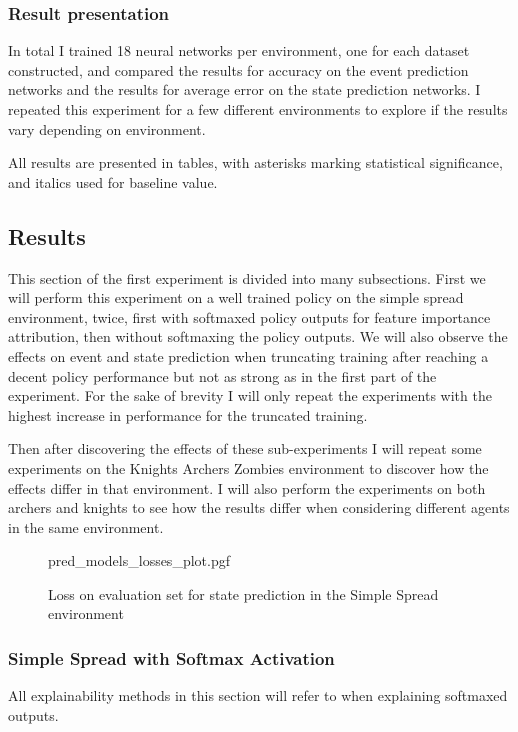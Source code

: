 \documentclass[UKenglish]{uiomasterthesis}
\begin{document}
\subsubsection{Result presentation}
In total I trained 18 neural networks per environment, one for each dataset constructed, and compared the results for accuracy on the event prediction networks and the results for average error on the state prediction networks. I repeated this experiment for a few different environments to explore if the results vary depending on environment.

All results are presented in tables, with asterisks marking statistical significance, and italics used for baseline value.

\subsection{Results}
This section of the first experiment is divided into many subsections. First we will perform this experiment on a well trained policy on the simple spread environment, twice, first with softmaxed policy outputs for feature importance attribution, then without softmaxing the policy outputs. We will also observe the effects on event and state prediction when truncating training after reaching a decent policy performance but not as strong as in the first part of the experiment. For the sake of brevity I will only repeat the experiments with the highest increase in performance for the truncated training.

Then after discovering the effects of these sub-experiments I will repeat some experiments on the Knights Archers Zombies environment to discover how the effects differ in that environment. I will also perform the experiments on both archers and knights to see how the results differ when considering different agents in the same environment.

\begin{figure}[H]
    \centering
    {pred_models_losses_plot.pgf}
	\label{fig:pred_losses}
    \caption{Loss on evaluation set for state prediction in the Simple Spread environment}
\end{figure}

\subsubsection{Simple Spread with Softmax Activation}
All explainability methods in this section will refer to when explaining softmaxed outputs.
\end{document}
